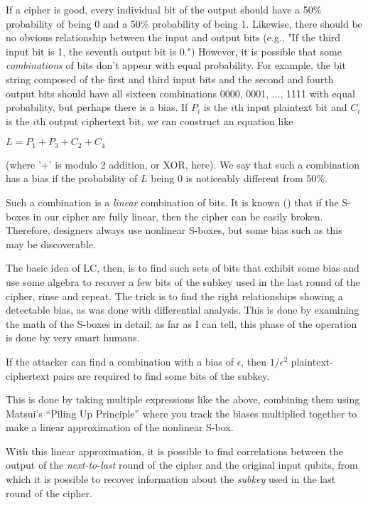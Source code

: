 If a cipher is good, every individual bit of the output should have a
50\% probability of being 0 and a 50\% probability of being 1.
Likewise, there should be no obvious relationship between the input
and output bits (e.g., "If the third input bit is 1, the seventh
output bit is 0.")  However, it is possible that some \emph{combinations}
of bits don't appear with equal probability. For example, the bit
string composed of the first and third input bits and the second and
fourth output bits should have all sixteen combinations 0000, 0001,
..., 1111 with equal probability, but perhaps there is a bias.  If $P_i$
is the $i$th input plaintext bit and $C_i$ is the $i$th output ciphertext
bit, we can construct an equation like

$L = P_1 + P_3 + C_2 + C_4$

(where '+' is modulo 2 addition, or XOR, here).  We say that such a
combination has a bias if the probability of $L$ being 0 is noticeably
different from 50\%.

Such a combination is a \emph{linear} combination of bits.  It is known () that if the S-boxes in our cipher are fully linear, then the
cipher can be easily broken.  Therefore, designers always use
nonlinear S-boxes, but some bias such as this may be discoverable.

The basic idea of LC, then, is to find such sets of bits that exhibit
some bias and use some algebra to recover a few bits of the subkey
used in the last round of the cipher, rinse and repeat.  The trick is
to find the right relationships showing a detectable bias, as was done
with differential analysis.  This is done by examining the math of the
S-boxes in detail; as far as I can tell, this phase of the operation
is done by very smart humans. \aonolook{}

If the attacker can find a combination with a bias of $\epsilon$, then
$1/\epsilon^2$ plaintext-ciphertext pairs are required to find some bits
of the subkey.

This is done by taking multiple expressions like the above, combining
them using Matsui's ``Piling Up Principle'' where you track the biases
multiplied together to make a linear approximation of the nonlinear
S-box.

With this linear approximation, it is possible to find correlations
between the output of the \emph{next-to-last} round of the cipher and the
original input qubits, from which it is possible to recover
information about the \emph{subkey} used in the last round of the cipher.

